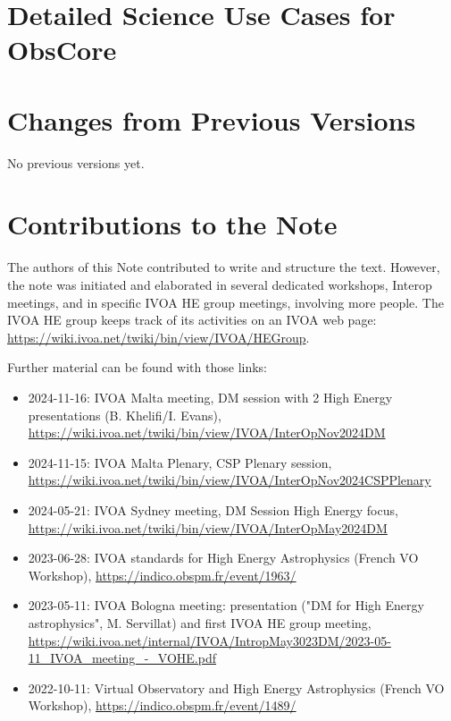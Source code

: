 \documentclass[11pt,a4paper]{ivoa}
\begin{document}
\section{Detailed Science Use Cases for ObsCore}
\label{sec:uc}




\section{Changes from Previous Versions}

No previous versions yet.


\section{Contributions to the Note}

The authors of this Note contributed to write and structure the text. However, the note was initiated and elaborated in several dedicated workshops, Interop meetings,  and in specific \gls{IVOA} \gls{HE} group meetings, involving more people. The \gls{IVOA} \gls{HE} group keeps track of its activities on an \gls{IVOA} web page: \url{https://wiki.ivoa.net/twiki/bin/view/IVOA/HEGroup}.

Further material can be found with those links:
\begin{itemize}
    \item 2024-11-16: IVOA Malta meeting, DM session with 2 High Energy presentations (B. Khelifi/I. Evans), \url{https://wiki.ivoa.net/twiki/bin/view/IVOA/InterOpNov2024DM}
    \item 2024-11-15: IVOA Malta Plenary, CSP Plenary session, \url{https://wiki.ivoa.net/twiki/bin/view/IVOA/InterOpNov2024CSPPlenary}
    \item 2024-05-21: IVOA Sydney meeting, DM Session High Energy focus, \url{https://wiki.ivoa.net/twiki/bin/view/IVOA/InterOpMay2024DM}
    \item 2023-06-28: IVOA standards for High Energy Astrophysics (French VO Workshop), \url{https://indico.obspm.fr/event/1963/}
    \item 2023-05-11: IVOA Bologna meeting: presentation ("DM for High Energy astrophysics", M. Servillat) and first IVOA HE group meeting, \url{https://wiki.ivoa.net/internal/IVOA/IntropMay3023DM/2023-05-11_IVOA_meeting_-_VOHE.pdf}
    \item 2022-10-11: Virtual Observatory and High Energy Astrophysics (French VO Workshop), \url{https://indico.obspm.fr/event/1489/}
\end{itemize}

\end{document}
